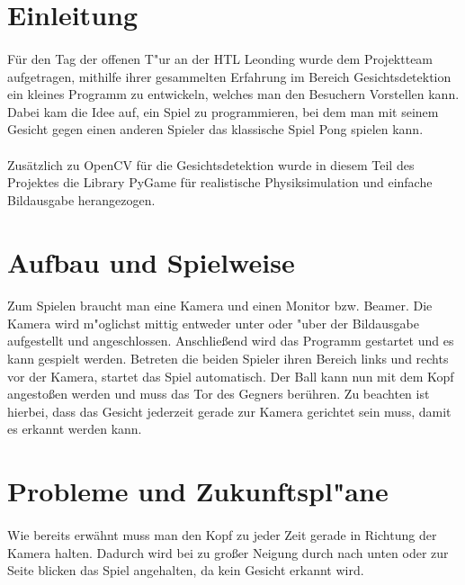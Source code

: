 \documentclass[12pt]{article}
\begin{document}
\section{Einleitung}
\paragraph{}
Für den Tag der offenen T"ur an der HTL Leonding wurde dem Projektteam
aufgetragen, mithilfe ihrer gesammelten Erfahrung im Bereich Gesichtsdetektion
ein kleines Programm zu entwickeln, welches man den Besuchern Vorstellen kann.
Dabei kam die Idee auf, ein Spiel zu programmieren, bei dem man mit seinem Gesicht
gegen einen anderen Spieler das klassische Spiel \glqq Pong\grqq{} spielen kann.
\paragraph{}
Zusätzlich zu OpenCV für die Gesichtsdetektion wurde in diesem Teil des Projektes
die Library PyGame für realistische Physiksimulation und einfache Bildausgabe
herangezogen.
\section{Aufbau und Spielweise}
\paragraph{}
Zum Spielen braucht man eine Kamera und einen Monitor bzw. Beamer. Die Kamera
wird m"oglichst mittig entweder unter oder "uber der Bildausgabe aufgestellt und angeschlossen.
Anschließend wird das Programm gestartet und es kann gespielt werden.
Betreten die beiden Spieler ihren Bereich links und rechts vor der Kamera,
startet das Spiel automatisch. Der Ball kann nun mit dem Kopf angestoßen werden
und muss das Tor des Gegners berühren. Zu beachten ist hierbei, dass
das Gesicht jederzeit gerade zur Kamera gerichtet sein muss, damit es erkannt werden kann.
\section{Probleme und Zukunftspl"ane}
\paragraph{}
Wie bereits erwähnt muss man den Kopf zu jeder Zeit gerade in Richtung
der Kamera halten. Dadurch wird bei zu großer Neigung durch nach unten oder zur
Seite blicken das Spiel angehalten, da kein Gesicht erkannt wird.
\end{document}
